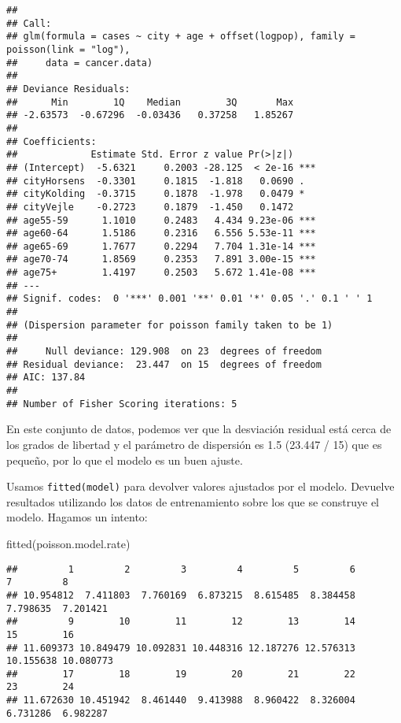 \documentclass[
]{book}
\newenvironment{Shaded}{\begin{snugshade}}{\end{snugshade}}
\newcommand{\FunctionTok}[1]{\textcolor[rgb]{0.00,0.00,0.00}{#1}}
\newcommand{\NormalTok}[1]{#1}
\begin{document}
\begin{verbatim}
## 
## Call:
## glm(formula = cases ~ city + age + offset(logpop), family = poisson(link = "log"), 
##     data = cancer.data)
## 
## Deviance Residuals: 
##      Min        1Q    Median        3Q       Max  
## -2.63573  -0.67296  -0.03436   0.37258   1.85267  
## 
## Coefficients:
##             Estimate Std. Error z value Pr(>|z|)    
## (Intercept)  -5.6321     0.2003 -28.125  < 2e-16 ***
## cityHorsens  -0.3301     0.1815  -1.818   0.0690 .  
## cityKolding  -0.3715     0.1878  -1.978   0.0479 *  
## cityVejle    -0.2723     0.1879  -1.450   0.1472    
## age55-59      1.1010     0.2483   4.434 9.23e-06 ***
## age60-64      1.5186     0.2316   6.556 5.53e-11 ***
## age65-69      1.7677     0.2294   7.704 1.31e-14 ***
## age70-74      1.8569     0.2353   7.891 3.00e-15 ***
## age75+        1.4197     0.2503   5.672 1.41e-08 ***
## ---
## Signif. codes:  0 '***' 0.001 '**' 0.01 '*' 0.05 '.' 0.1 ' ' 1
## 
## (Dispersion parameter for poisson family taken to be 1)
## 
##     Null deviance: 129.908  on 23  degrees of freedom
## Residual deviance:  23.447  on 15  degrees of freedom
## AIC: 137.84
## 
## Number of Fisher Scoring iterations: 5
\end{verbatim}

En este conjunto de datos, podemos ver que la desviación residual está cerca de los grados de libertad y el parámetro de dispersión es 1.5 (23.447 / 15) que es pequeño, por lo que el modelo es un buen ajuste.

Usamos \texttt{fitted(model)} para devolver valores ajustados por el modelo. Devuelve resultados utilizando los datos de entrenamiento sobre los que se construye el modelo. Hagamos un intento:

\begin{Shaded}
\begin{Highlighting}[]
\FunctionTok{fitted}\NormalTok{(poisson.model.rate)}
\end{Highlighting}
\end{Shaded}

\begin{verbatim}
##         1         2         3         4         5         6         7         8 
## 10.954812  7.411803  7.760169  6.873215  8.615485  8.384458  7.798635  7.201421 
##         9        10        11        12        13        14        15        16 
## 11.609373 10.849479 10.092831 10.448316 12.187276 12.576313 10.155638 10.080773 
##        17        18        19        20        21        22        23        24 
## 11.672630 10.451942  8.461440  9.413988  8.960422  8.326004  6.731286  6.982287
\end{verbatim}
\end{document}
